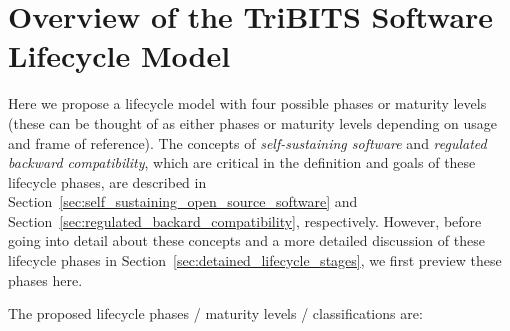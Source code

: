 \documentclass[11pt]{SANDreport}
\begin{document}
%
{}\section{Overview of the TriBITS Software Lifecycle Model}
\label{sec:life_cycle_overview}
%

Here we propose a lifecycle model with four possible phases or
maturity levels (these can be thought of as either phases or maturity
levels depending on usage and frame of reference).  The concepts of
\textit{self-sustaining software} and \textit{regulated backward compatibility},
which are critical in the definition and goals of these lifecycle
phases, are described in
Section~\ref{sec:self_sustaining_open_source_software} and
Section~\ref{sec:regulated_backard_compatibility}, respectively.
However, before going into detail about these concepts and a more
detailed discussion of these lifecycle phases in
Section~\ref{sec:detained_lifecycle_stages}, we first preview these
phases here.

The proposed lifecycle phases / maturity levels / classifications are:
\end{document}
